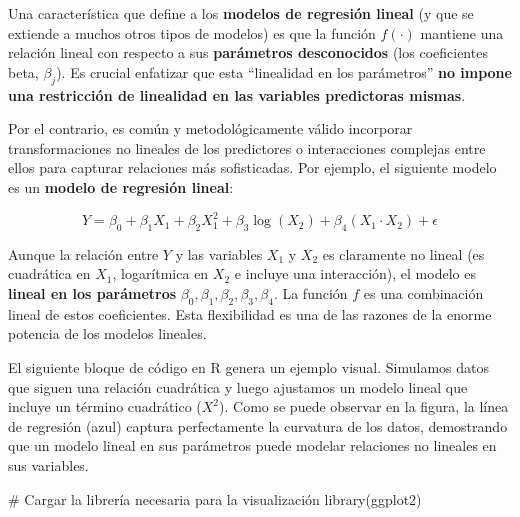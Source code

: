 \documentclass[
  letterpaper,
  DIV=11,
  numbers=noendperiod]{scrreprt}
\newenvironment{Shaded}{\begin{snugshade}}{\end{snugshade}}
\newcommand{\CommentTok}[1]{\textcolor[rgb]{0.37,0.37,0.37}{#1}}
\newcommand{\FunctionTok}[1]{\textcolor[rgb]{0.28,0.35,0.67}{#1}}
\newcommand{\NormalTok}[1]{\textcolor[rgb]{0.00,0.23,0.31}{#1}}
\begin{document}
\begin{tcolorbox}[enhanced jigsaw, leftrule=.75mm, breakable, colbacktitle=quarto-callout-caution-color!10!white, bottomrule=.15mm, colframe=quarto-callout-caution-color-frame, toprule=.15mm, colback=white, coltitle=black, bottomtitle=1mm, left=2mm, title=\textcolor{quarto-callout-caution-color}{\faFire}\hspace{0.5em}{Linealidad en los parámetros, no en las variables}, opacityback=0, arc=.35mm, opacitybacktitle=0.6, toptitle=1mm, titlerule=0mm, rightrule=.15mm]

Una característica que define a los \textbf{modelos de regresión lineal}
(y que se extiende a muchos otros tipos de modelos) es que la función
\(f(\cdot)\) mantiene una relación lineal con respecto a sus
\textbf{parámetros desconocidos} (los coeficientes beta, \(\beta_j\)).
Es crucial enfatizar que esta ``linealidad en los parámetros''
\textbf{no impone una restricción de linealidad en las variables
predictoras mismas}.

Por el contrario, es común y metodológicamente válido incorporar
transformaciones no lineales de los predictores o interacciones
complejas entre ellos para capturar relaciones más sofisticadas. Por
ejemplo, el siguiente modelo es un \textbf{modelo de regresión lineal}:

\[Y = \beta_0 + \beta_1 X_1 + \beta_2 X_1^2 + \beta_3 \log(X_2) + \beta_4 (X_1 \cdot X_2) + \epsilon\]

Aunque la relación entre \(Y\) y las variables \(X_1\) y \(X_2\) es
claramente no lineal (es cuadrática en \(X_1\), logarítmica en \(X_2\) e
incluye una interacción), el modelo es \textbf{lineal en los parámetros}
\(\beta_0, \beta_1, \beta_2, \beta_3, \beta_4\). La función \(f\) es una
combinación lineal de estos coeficientes. Esta flexibilidad es una de
las razones de la enorme potencia de los modelos lineales.

El siguiente bloque de código en R genera un ejemplo visual. Simulamos
datos que siguen una relación cuadrática y luego ajustamos un modelo
lineal que incluye un término cuadrático (\(X^2\)). Como se puede
observar en la figura, la línea de regresión (azul) captura
perfectamente la curvatura de los datos, demostrando que un modelo
lineal en sus parámetros puede modelar relaciones no lineales en sus
variables.

\begin{Shaded}
\begin{Highlighting}[]
\CommentTok{\# Cargar la librería necesaria para la visualización}
\FunctionTok{library}\NormalTok{(ggplot2)}


\end{Highlighting}
\end{Shaded}
\end{tcolorbox}
\end{document}
